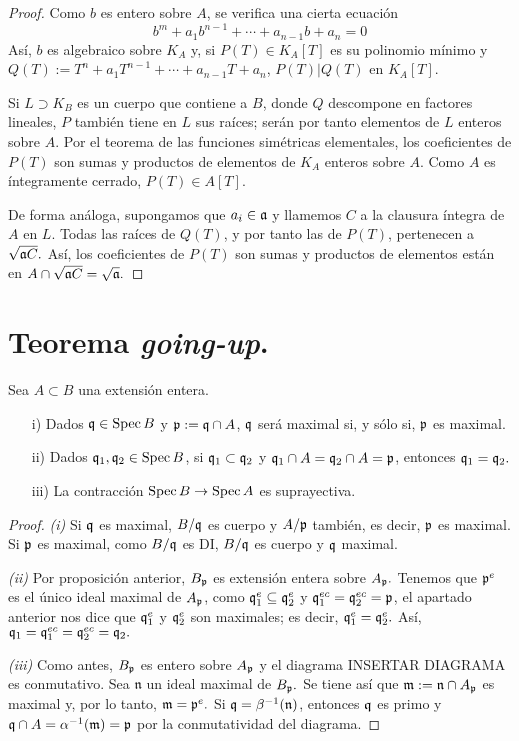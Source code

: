 \documentclass[../main.tex]{subfiles}
\begin{document}
\begin{proof}
Como $b$ es entero sobre $A$, se verifica una cierta ecuación
$$b^m+a_1b^{n-1}+\cdots+a_{n-1}b+a_n=0$$
Así, $b$ es algebraico sobre $K_A$ y, si $P(T)\in K_A[T]$ es su polinomio mínimo y $Q(T):=T^n+a_1T^{n-1}+\cdots+a_{n-1}T+a_n$, $P(T)|Q(T)$ en $K_A[T].$

Si $L\supset K_B$ es un cuerpo que contiene a $B$, donde $Q$ descompone en factores lineales, $P$ también tiene en $L$ sus raíces; serán por tanto elementos de $L$ enteros sobre $A.$ Por el teorema de las funciones simétricas elementales, los coeficientes de $P(T)$ son sumas y productos de elementos de $K_A$ enteros sobre $A.$ Como $A$ es íntegramente cerrado, $P(T)\in A[T].$

De forma análoga, supongamos que $a_i\in\mathfrak{a}$ y llamemos $C$ a la clausura íntegra de $A$ en $L.$ Todas las raíces de $Q(T)$, y por tanto las de $P(T)$, pertenecen a $\sqrt{\mathfrak{a} C}.$ Así, los coeficientes de $P(T)$ son sumas y productos de elementos están en $A\cap\sqrt{\mathfrak{a} C}=\sqrt{\mathfrak{a}}.$
\end{proof}

\section{Teorema \textit{going-up}.}
\begin{proposition}\label{prop:lying} Sea $A\subset B$ una extensión entera.
\begin{itemize}
    \item[i)] Dados $\mathfrak{q}\in\operatorname{Spec} B$ y $\mathfrak{p}:=\mathfrak{q}\cap A$, $\mathfrak{q}$ será maximal si, y sólo si, $\mathfrak{p}$ es maximal.
    \item[ii)] Dados $\mathfrak{q}_1,\mathfrak{q}_2\in\operatorname{Spec} B$, si $\mathfrak{q}_1\subset\mathfrak{q}_2$ y $\mathfrak{q}_1\cap A=\mathfrak{q}_2\cap A=\mathfrak{p}$, entonces $\mathfrak{q}_1=\mathfrak{q}_2.$
    \item[iii)] La contracción $\operatorname{Spec} B\rightarrow\operatorname{Spec} A$ es suprayectiva.
\end{itemize}
\end{proposition}

\begin{proof}
\textit{(i)} Si $\mathfrak{q}$ es maximal, $B/\mathfrak{q}$ es cuerpo y $A/\mathfrak{p}$ también, es decir, $\mathfrak{p}$ es maximal. Si $\mathfrak{p}$ es maximal, como $B/\mathfrak{q}$ es DI, $B/\mathfrak{q}$ es cuerpo y $\mathfrak{q}$ maximal.

\textit{(ii)} Por proposición anterior, $B_{\mathfrak{p}}$ es extensión entera sobre $A_{\mathfrak{p}}.$ Tenemos que $\mathfrak{p}^e$ es el único ideal maximal de $A_{\mathfrak{p}}$, como $\mathfrak{q}_1^e\subseteq \mathfrak{q}_2^e$ y $\mathfrak{q}_1^{ec}= \mathfrak{q}_2^{ec}=\mathfrak{p}$, el apartado anterior nos dice que $\mathfrak{q}_1^e$ y $\mathfrak{q}_2^e$ son maximales; es decir, $\mathfrak{q}_1^e=\mathfrak{q}_2^e.$ Así, $\mathfrak{q}_1=\mathfrak{q}_1^{ec}=\mathfrak{q}_2^{ec}=\mathfrak{q}_2.$

\textit{(iii)} Como antes, $B_{\mathfrak{p}}$ es entero sobre $A_{\mathfrak{p}}$ y el diagrama INSERTAR DIAGRAMA es conmutativo. Sea $\mathfrak{n}$ un ideal maximal de $B_{\mathfrak{p}}.$ Se tiene así que $\mathfrak{m}:=\mathfrak{n}\cap A_{\mathfrak{p}}$ es maximal y, por lo tanto, $\mathfrak{m}=\mathfrak{p}^e.$ Si $\mathfrak{q}=\beta^{-1}(\mathfrak{n})$, entonces $\mathfrak{q}$ es primo y $\mathfrak{q}\cap A=\alpha^{-1}(\mathfrak{m})=\mathfrak{p}$ por la conmutatividad del diagrama.
\end{proof}
\end{document}
